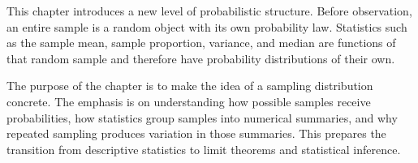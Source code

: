 This chapter introduces a new level of probabilistic structure. Before observation, an entire sample is a random object with its own probability law. Statistics such as the sample mean, sample proportion, variance, and median are functions of that random sample and therefore have probability distributions of their own.

The purpose of the chapter is to make the idea of a sampling distribution concrete. The emphasis is on understanding how possible samples receive probabilities, how statistics group samples into numerical summaries, and why repeated sampling produces variation in those summaries. This prepares the transition from descriptive statistics to limit theorems and statistical inference.







